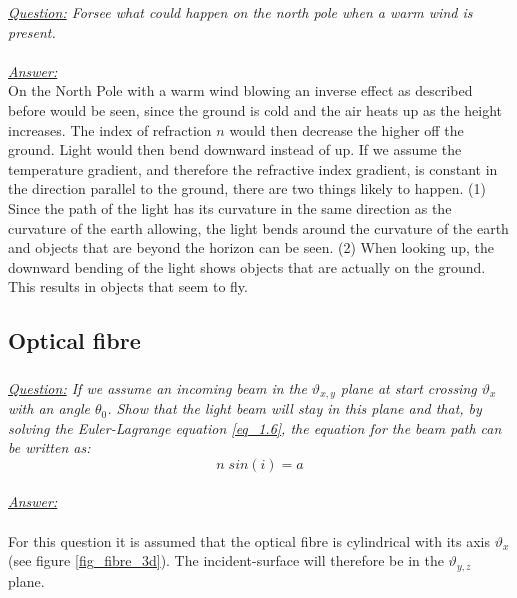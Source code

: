 \documentclass{article}
\begin{document}
\textit{\underline{Question:} Forsee what could happen on the north pole when a warm wind is present.}\\
\\
\textit{\underline{Answer:}} \\
On the North Pole with a warm wind blowing an inverse effect as described before would be seen, since the ground is cold and the air heats up as the height increases. The index of refraction $n$ would then decrease the higher off the ground. Light would then bend downward instead of up. If we assume the temperature gradient, and therefore the refractive index gradient, is constant in the direction parallel to the ground, there are two things likely to happen. (1) Since the path of the light has its curvature in the same direction as the curvature of the earth allowing, the light bends around the curvature of the earth and objects that are beyond the horizon can be seen. (2) When looking up, the downward bending of the light shows objects that are actually on the ground. This results in objects that seem to fly.\\

\subsection{Optical fibre}

\subsubsection{}

\textit{\underline{Question:} If we assume an incoming beam in the $\vartheta _{x,y}$ plane at start crossing $\vartheta _x$ with an angle $\theta _0$. Show that the light beam will stay in this plane and that, by solving the Euler-Lagrange equation \ref{eq_1.6}, the equation for the beam path can be written as:}\\
\begin{equation}
	n \; sin(i) = a
	\label{eq_2.1}
\end{equation}
\\
\textit{\underline{Answer:}} \\
\\

For this question it is assumed that the optical fibre is cylindrical with its axis $\vartheta _x$ (see figure \ref{fig_fibre_3d}). The incident-surface will therefore be in the $\vartheta _{y,z}$ plane.\\
\end{document}
